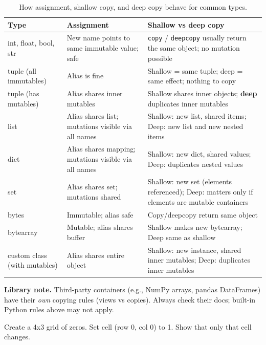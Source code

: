 
\renewcommand{\arraystretch}{1.12}
\begin{table}[h]
\centering
\begin{tabularx}{\textwidth}{|l|X|X|}
\hline
\textbf{Type} & \textbf{Assignment} & \textbf{Shallow vs deep copy} \\ \hline
int, float, bool, str & New name points to same immutable value; safe & \texttt{copy} / \texttt{deepcopy} usually return the same object; no mutation possible \\ \hline
tuple (all immutables) & Alias is fine & Shallow = same tuple; deep = same effect; nothing to copy \\ \hline
tuple (has mutables) & Alias shares inner mutables & Shallow shares inner objects; \textbf{deep} duplicates inner mutables \\ \hline
list & Alias shares list; mutations visible via all names & Shallow: new list, shared items; Deep: new list and new nested items \\ \hline
dict & Alias shares mapping; mutations visible via all names & Shallow: new dict, shared values; Deep: duplicates nested values \\ \hline
set & Alias shares set; mutations shared & Shallow: new set (elements referenced); Deep: matters only if elements are mutable containers \\ \hline
bytes & Immutable; alias safe & Copy/deepcopy return same object \\ \hline
bytearray & Mutable; alias shares buffer & Shallow makes new bytearray; Deep same as shallow \\ \hline
custom class (with mutables) & Alias shares entire object & Shallow: new instance, shared inner mutables; Deep: duplicates inner mutables \\ \hline
\end{tabularx}
\caption{How assignment, shallow copy, and deep copy behave for common types.\label{tab:copying_Data_Reference}}
\end{table}

\begin{NoteBox}
\textbf{Library note.} Third-party containers (e.g., NumPy arrays, pandas DataFrames) have their \emph{own} copying rules (views vs copies). Always check their docs; built-in Python rules above may not apply.
\end{NoteBox}


Create a 4x3 grid of zeros. Set cell (row 0, col 0) to 1. Show that only that cell changes.

